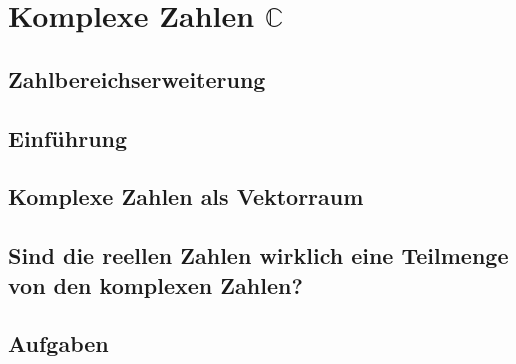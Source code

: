 \documentclass{article}
\begin{document}
    \large  

    \section{Komplexe Zahlen $\mathbb{C}$}


    \subsection{Zahlbereichserweiterung}

    

    \subsection{Einführung}

    

    \subsection{Komplexe Zahlen als Vektorraum}

    

    \subsection{Sind die reellen Zahlen wirklich eine Teilmenge von den komplexen Zahlen?}

    




    \subsection{Aufgaben}

    
\end{document}
